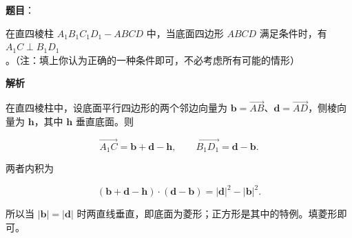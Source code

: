 \begin{answer}

\textbf{题目}：

在直四棱柱 $A_1B_1C_1D_1-ABCD$ 中，当底面四边形 $ABCD$ 满足条件\gkblank{}时，有 $A_1C\perp B_1D_1$。（注：填上你认为正确的一种条件即可，不必考虑所有可能的情形）

\textbf{解析}

在直四棱柱中，设底面平行四边形的两个邻边向量为 $\boldsymbol b=\overrightarrow{AB}$、$\boldsymbol d=\overrightarrow{AD}$，侧棱向量为 $\boldsymbol h$，其中 $\boldsymbol h$ 垂直底面。则

\nopagebreak[4]
\[
\overrightarrow{A_1C}=\boldsymbol b+\boldsymbol d-\boldsymbol h,
\qquad
\overrightarrow{B_1D_1}=\boldsymbol d-\boldsymbol b.
\]

两者内积为

\nopagebreak[4]
\[
(\boldsymbol b+\boldsymbol d-\boldsymbol h)\cdot(\boldsymbol d-\boldsymbol b)
=|\boldsymbol d|^2-|\boldsymbol b|^2.
\]

所以当 $|\boldsymbol b|=|\boldsymbol d|$ 时两直线垂直，即底面为菱形；正方形是其中的特例。填菱形即可。


\end{answer}
